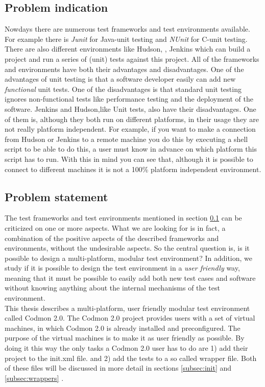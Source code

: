 \documentclass[a4paper,10pt]{scrartcl}
\newcommand{\project}{Codmon 2.0}
\newcommand{\CS}{C\nolinebreak\hspace{-.05em}\raisebox{.6ex}{\bf \#}}
\begin{document}
\subsection{Problem indication}
\label{subsec:Problemindication}
Nowdays there are numerous test frameworks and test environments available. For example there is \emph{Junit}\cite{Junit} for Java-unit testing and \emph{NUnit}\cite{Nunit} for \CS{}-unit testing.
There are also different environments like Hudson\cite{HudsonDoc}, \cite{Hudson}, Jenkins\cite{JenkinsDoc} which can build a project and run a series of (unit) tests against this project. 
All of the frameworks and environments have both their advantages and disadvantages. One of the advantages of unit testing is that a software developer easily can add new \emph{functional} unit tests.
One of the disadvantages is that standard unit testing ignores non-functional tests like performance testing and the deployment of the software. Jenkins and Hudson,like Unit tests, also have their
disadvantages. One of them is, although they both run on different platforms, in their usage they are not really platform independent. For example, if you want
to make a connection from Hudson or Jenkins to a remote machine you do this by executing a shell script to be able to do this, a user must know in advance on which platform this script has to run.
With this in mind you can see that, although it is possible to connect to different machines it is not a 100\% platform independent environment.
 
\subsection{Problem statement}
\label{subsec:Problemstatement}
The test frameworks and test environments mentioned in section \ref{subsec:Problemindication} can be criticized on one or more aspects. What we are looking for is in fact, a combination
of the positive aspects of the described frameworks and environments, without the undesirable aspects. So the central question is, is it possible to design a
multi-platform, modular test environment? In addition, we study if it is possible to design the test environment in a \emph{user friendly} way, meaning that it must
be possible to easily add both new test cases and software without knowing anything about the internal mechanisms of the test environment.\\

\noindent This thesis describes a multi-platform, user friendly modular test environment called \project{}. The \project{} project provides users with a set of virtual machines,
in which \project{} is already installed and preconfigured. The purpose of the virtual machines is to make it as user friendly as possible. By doing it this way the only tasks
a \project{} user has to do are 1) add their project  to the init.xml file. and 2) add the tests to a so called wrapper file. Both of these files will be discussed in more detail in 
sections \ref{subsec:init} and \ref{subsec:wrappers} .
\end{document}
